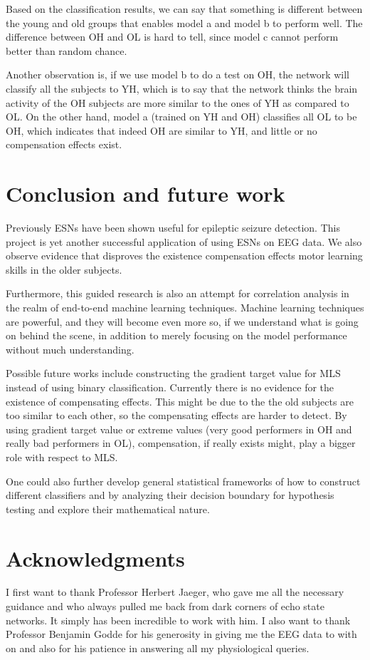 \documentclass[a4paper,11pt,oneside]{article}
\begin{document}
Based on the classification results, we can say that something is different between the young and old groups that enables model a and model b to perform well. The difference between OH and OL is hard to tell, since model c cannot perform better than random chance. 

Another observation is, if we use model b to do a test on OH, the network will classify all the subjects to YH, which is to say that the network thinks the brain activity of the OH subjects are more similar to the ones of YH as compared to OL. On the other hand, model a (trained on YH and OH) classifies all OL to be OH, which indicates that indeed OH are similar to YH, and little or no compensation effects exist. 

\section{Conclusion and future work}
Previously ESNs have been shown useful for epileptic seizure detection. This project is yet another successful application of using ESNs on EEG data. We also observe evidence that disproves the existence  compensation effects motor learning skills in the older subjects.

Furthermore, this guided research is also an attempt for correlation analysis in the realm of end-to-end machine learning techniques. Machine learning techniques are powerful, and they will become even more so, if we understand what is going on behind the scene, in addition to merely focusing on the model performance without much understanding. 

Possible future works include constructing the gradient target value for MLS instead of using binary classification. Currently there is no evidence for the existence of compensating effects. This might be due to the the old subjects are too similar to each other, so the compensating effects are harder to detect. By using gradient target value or extreme values (very good performers in OH and really bad performers in OL), compensation, if really exists might, play a bigger role with respect to MLS. 

One could also further develop general statistical frameworks of how to construct different classifiers and by analyzing their decision boundary for hypothesis testing and explore their mathematical nature.

\section{Acknowledgments}
I first want to thank Professor Herbert Jaeger, who gave me all the necessary guidance and who always pulled me back from dark corners of echo state networks. It simply has been incredible to work with him. I also want to thank Professor Benjamin Godde for his generosity in giving me the EEG data to with on and also for his patience in answering all my physiological queries.


\clearpage
\newpage





\end{document}
